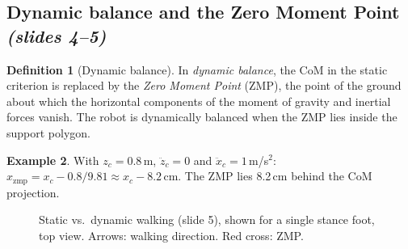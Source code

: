 \documentclass[11pt,a4paper]{article}
\theoremstyle{definition}
\newtheorem{definition}{Definition}[section]
\newtheorem{example}[definition]{Example}
\theoremstyle{plain}
\newtheorem{proposition}[definition]{Proposition}
\newcommand{\com}[1]{\begin{scope}[shift={(#1)}]\draw[fill=white,thick] (0,0) circle (0.13);
  \fill (0,0) -- (0.13,0) arc (0:90:0.13) -- cycle;
  \fill (0,0) -- (-0.13,0) arc (180:270:0.13) -- cycle;\end{scope}}
\newcommand{\zmpmark}[1]{\begin{scope}[shift={(#1)}]\draw[red!70!black,very thick]
  (-0.12,-0.12)--(0.12,0.12) (-0.12,0.12)--(0.12,-0.12);\end{scope}}
\begin{document}
\subsection{Dynamic balance and the Zero Moment Point \emph{(slides 4--5)}}

\begin{definition}[Dynamic balance]
In \emph{dynamic balance}, the CoM in the static criterion is replaced by the \emph{Zero Moment Point} (ZMP), the point of the ground about which the horizontal components of the moment of gravity and inertial forces vanish. The robot is dynamically balanced when the ZMP lies inside the support polygon.
\end{definition}


\begin{example}
With $z_c=0.8$\,m, $\ddot z_c=0$ and $\ddot x_c=1$\,m/s$^2$: $x_{\mathrm{zmp}}=x_c-0.8/9.81\approx x_c-8.2$\,cm. The ZMP lies 8.2\,cm behind the CoM projection.
\end{example}

\begin{figure}[H]
\centering
{}
\caption{Static vs.\ dynamic walking (slide 5), shown for a single stance foot, top view. Arrows: walking direction. Red cross: ZMP.}
\end{figure}
\end{document}

